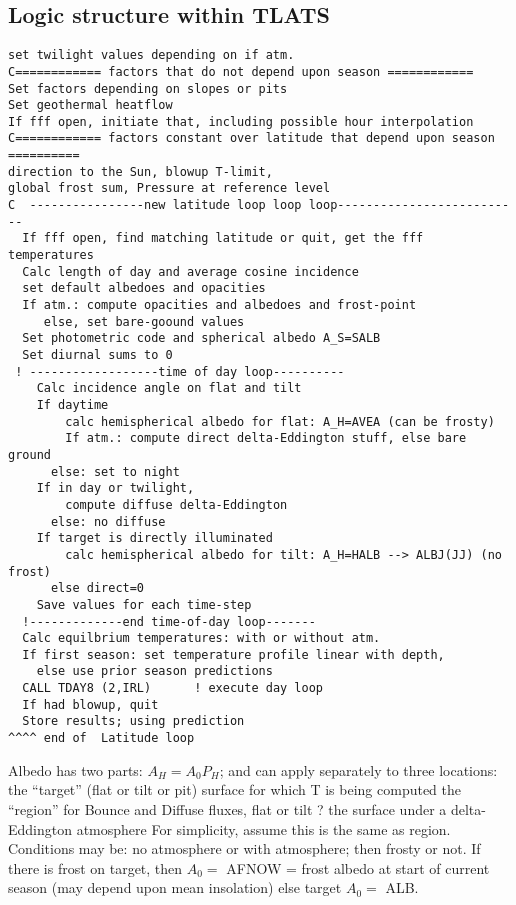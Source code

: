 \subsection{Logic structure within TLATS}
\vspace{-3.mm} 
\begin{verbatim}
set twilight values depending on if atm.
C============ factors that do not depend upon season ============
Set factors depending on slopes or pits
Set geothermal heatflow
If fff open, initiate that, including possible hour interpolation
C============ factors constant over latitude that depend upon season ==========
direction to the Sun, blowup T-limit,
global frost sum, Pressure at reference level
C  ----------------new latitude loop loop loop--------------------------
  If fff open, find matching latitude or quit, get the fff temperatures
  Calc length of day and average cosine incidence
  set default albedoes and opacities
  If atm.: compute opacities and albedoes and frost-point
     else, set bare-goound values
  Set photometric code and spherical albedo A_S=SALB
  Set diurnal sums to 0
 ! ------------------time of day loop----------
    Calc incidence angle on flat and tilt
    If daytime 
        calc hemispherical albedo for flat: A_H=AVEA (can be frosty)
        If atm.: compute direct delta-Eddington stuff, else bare ground
      else: set to night
    If in day or twilight,
        compute diffuse delta-Eddington
      else: no diffuse
    If target is directly illuminated
        calc hemispherical albedo for tilt: A_H=HALB --> ALBJ(JJ) (no frost)
      else direct=0
    Save values for each time-step
  !-------------end time-of-day loop-------
  Calc equilbrium temperatures: with or without atm.
  If first season: set temperature profile linear with depth, 
    else use prior season predictions
  CALL TDAY8 (2,IRL)      ! execute day loop
  If had blowup, quit
  Store results; using prediction
^^^^ end of  Latitude loop
\end{verbatim} 
 
Albedo has two parts: $A_H = A_0 P_H$; and can apply separately to three locations:
\qi the ``target'' (flat or tilt or pit) surface for which T is being computed
\qi the ``region'' for Bounce and Diffuse fluxes, flat or tilt ?
\qi the surface under a  delta-Eddington atmosphere 
\qii For simplicity, assume this is the same as region.
\\ Conditions may be: no atmosphere or with atmosphere; then frosty or not.
If there is frost on target,  then $A_0=$ AFNOW = frost albedo at start of current season (may depend upon mean insolation)
\qi else  target $A_0=$ ALB.

